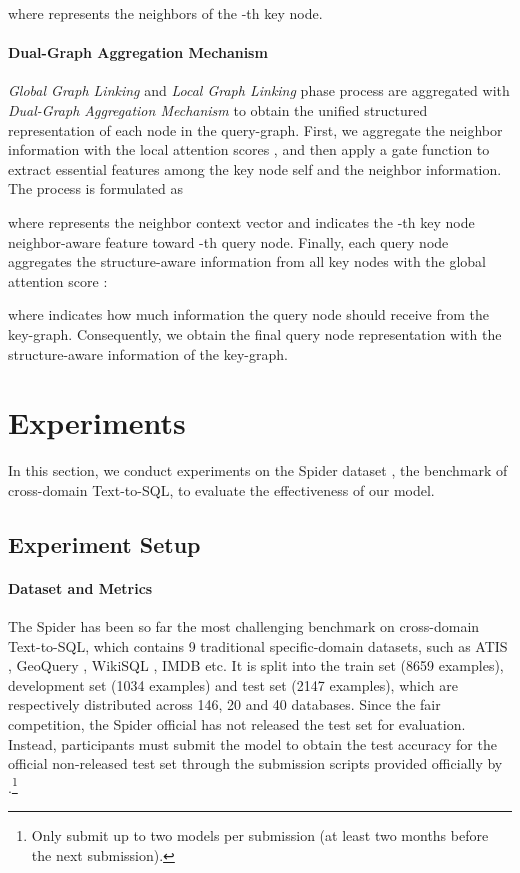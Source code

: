\documentclass{article}
\begin{document}
where  represents the neighbors of the -th key node. 

\paragraph{Dual-Graph Aggregation Mechanism}
\emph{Global Graph Linking} and \emph{Local Graph Linking} phase process are aggregated with \emph{Dual-Graph Aggregation Mechanism} to obtain the unified structured representation of each node in the query-graph.
First, we aggregate the neighbor information with the local attention scores , and then apply a gate function to extract essential features among the key node self and the neighbor information. The process is formulated as

where  represents the neighbor context vector and  indicates the -th key node neighbor-aware feature toward -th query node. 
Finally, each query node aggregates the structure-aware information from all key nodes with the global attention score :

where  indicates how much information the query node should receive from the key-graph.
Consequently, we obtain the final query node representation  with the structure-aware information of the key-graph.

\section{Experiments}
In this section, we conduct experiments on the Spider dataset \citep{yu2018spider}, the benchmark of cross-domain Text-to-SQL, to evaluate the effectiveness of our model.

\subsection{Experiment Setup}

\paragraph{Dataset and Metrics}
The Spider has been so far the most challenging benchmark on cross-domain Text-to-SQL, which contains 9 traditional specific-domain datasets, such as ATIS \citep{dahl1994expanding}, GeoQuery \citep{zelle1996learning}, WikiSQL \citep{zhongSeq2SQL2017}, IMDB \citep{yaghmazadeh2017sqlizer} etc. It is split into the train set (8659 examples), development set (1034 examples) and test set (2147 examples), which are respectively distributed across 146, 20 and 40 databases. Since the fair competition, the Spider official has not released the test set for evaluation. Instead, participants must submit the model to obtain the test accuracy for the official non-released test set through the submission scripts provided officially by \citet{yu2018spider}.\footnote {Only submit up to two models per submission (at least two months before the next submission).}
\end{document}
